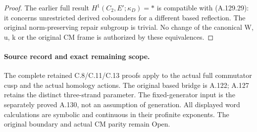 \begin{proof}
The earlier full result \(H^1(C_2,E';\kappa_D)=*\) is compatible with (A.129.29): it concerns unrestricted derived cobounders for a different based reflection. The original norm-preserving repair subgroup is trivial. No change of the canonical W, u, k or the original CM frame is authorized by these equivalences.

\end{proof}

\paragraph{Source record and exact remaining scope.}
The complete retained C.8/C.11/C.13 proofs apply to the actual full
commutator cusp and the actual homology actions. The original based
bridge is A.122; A.127 retains the distinct three-strand parameter.
The fixed-generator input is the separately proved A.130, not an
assumption of generation. All displayed word calculations are
symbolic and continuous in their profinite exponents. The original
boundary and actual CM parity remain Open.
